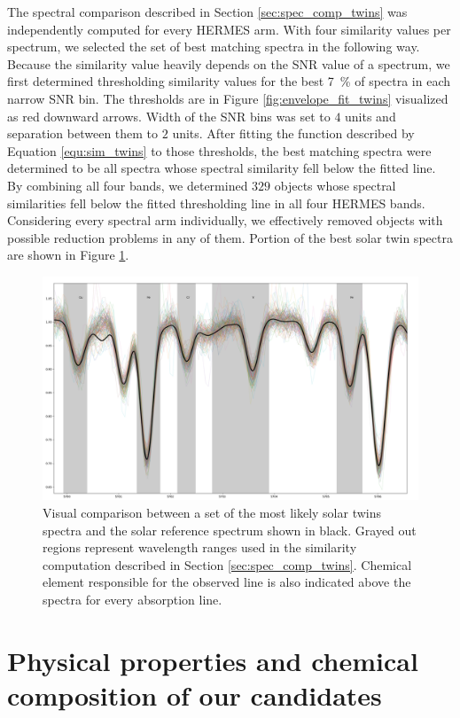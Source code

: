 The spectral comparison described in Section \ref{sec:spec_comp_twins} was independently computed for every HERMES arm. With four similarity values per spectrum, we selected the set of best matching spectra in the following way. Because the similarity value heavily depends on the SNR value of a spectrum, we first determined thresholding similarity values for the best 7~\% of spectra in each narrow SNR bin. The thresholds are in Figure \ref{fig:envelope_fit_twins} visualized as red downward arrows. Width of the SNR bins was set to $4$ units and separation between them to $2$ units. After fitting the function described by Equation \ref{equ:sim_twins} to those thresholds, the best matching spectra were determined to be all spectra whose spectral similarity fell below the fitted line. By combining all four bands, we determined $329$ objects whose spectral similarities fell below the fitted thresholding line in all four HERMES bands. Considering every spectral arm individually, we effectively removed objects with possible reduction problems in any of them. Portion of the best solar twin spectra are shown in Figure \ref{fig:selection_step1_twins}.

\begin{figure}
	\centering
	\includegraphics[width=\textwidth]{selection_step1.png}
	\caption{Visual comparison between a set of the most likely solar twins spectra and the solar reference spectrum shown in black. Grayed out regions represent wavelength ranges used in the similarity computation described in Section \ref{sec:spec_comp_twins}. Chemical element responsible for the observed line is also indicated above the spectra for every absorption line.}
	\label{fig:selection_step1_twins}
\end{figure}

\section{Physical properties and chemical composition of our candidates}
\label{sec:05_chem_compos}

